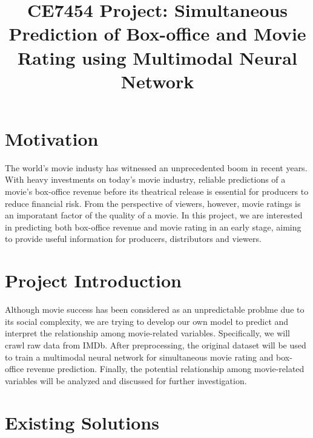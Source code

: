\documentclass[conference]{IEEEtran}
\begin{document}
\title{CE7454 Project: Simultaneous Prediction of Box-office and Movie Rating using Multimodal Neural Network}

\author{
}
\maketitle

\renewcommand{\thefootnote}{\fnsymbol{footnote}}

\section{Motivation}

The world's movie industy has witnessed an unprecedented boom in recent years.
With heavy investments on today's movie industry, reliable predictions of a movie's box-office
revenue before its theatrical release is essential for producers to reduce financial risk. From the
perspective of viewers, however, movie ratings is an imporatant factor of the quality of a movie. In
this project, we are interested in predicting both box-office revenue and movie rating in an early stage,
aiming to provide useful information for producers, distributors and viewers. 

\section{Project Introduction}

Although movie success has been considered as an unpredictable problme due to its social complexity, we 
are trying to develop our own model to predict and interpret the relationship among movie-related variables. 
Specifically, we will crawl raw data from IMDb. After preprocessing,
the original dataset will be used to train a multimodal neural network for simultaneous movie rating and box-office
revenue prediction. Finally, the potential relationship among movie-related variables will be analyzed and discussed for further investigation.

\section{Existing Solutions}
\end{document}
